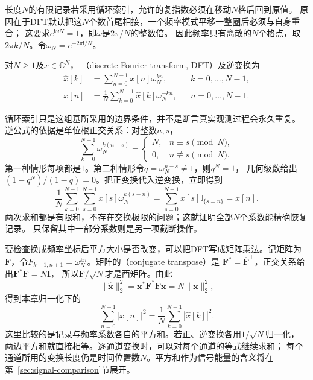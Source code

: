 长度$N$的有限记录若采用循环索引，允许的复指数必须在移动$N$格后回到原值。
原因在于DFT默认把这$N$个数首尾相接，一个频率模式平移一整圈后必须与自身重合；
这要求$e^{\mathrm i\omega N}=1$，即$\omega$是$2\pi/N$的整数倍。
因此频率只有离散的$N$个格点，取$2\pi k/N$。令$\omega_N=e^{-2\pi\mathrm i/N}$。
\begin{definition}[离散傅里叶变换]
  \label{def:signal-analysis-dft}
  对$N\geq1$及$x\in\mathbb C^N$，
  （discrete Fourier transform, DFT）及逆变换为
  \begin{align}
    \widehat x[k]&=\sum_{n=0}^{N-1}x[n]\omega_N^{kn},
    &&k=0,\ldots,N-1,
    \label{eq:signal-analysis-dft}\\
    x[n]&=\frac1N\sum_{k=0}^{N-1}\widehat x[k]\omega_N^{-kn},
    &&n=0,\ldots,N-1.
    \label{eq:signal-analysis-idft}
  \end{align}
\BookEquationAliases{\label{eq:cnn-dft-inverse}}
\end{definition}
循环索引只是这组基所采用的边界条件，并不是断言真实观测过程会永久重复。
逆公式的依据是单位根正交关系：对整数$n,s$，
\begin{equation}
  \sum_{k=0}^{N-1}\omega_N^{k(n-s)}
  =
  \begin{cases}
    N,&n\equiv s\pmod N,\\
    0,&n\not\equiv s\pmod N.
  \end{cases}
  \label{eq:signal-analysis-root-orthogonality}
\end{equation}
第一种情形每项都是$1$。第二种情形令$q=\omega_N^{n-s}\neq1$，则$q^N=1$，
几何级数给出$(1-q^N)/(1-q)=0$。把正变换代入逆变换，立即得到
\[
  \frac1N\sum_{k=0}^{N-1}\sum_{s=0}^{N-1}x[s]\omega_N^{k(s-n)}
  =\sum_{s=0}^{N-1}x[s]\mathbb I_{\{s=n\}}=x[n].
\]
两次求和都是有限和，不存在交换极限的问题；这就证明全部$N$个系数能精确恢复记录。
只保留其中一部分系数则是另一项截断操作。

要检查换成频率坐标后平方大小是否改变，可以把DFT写成矩阵乘法。记矩阵为
$\bm F$，令$F_{k+1,n+1}=\omega_N^{kn}$。矩阵的（conjugate transpose）是
$\bm F^*=\overline{\bm F}^{\top}$，正交关系给出$\bm F^*\bm F=N\bm I$，
所以$\bm F/\sqrt N$才是酉矩阵。由此
\[
  \|\widehat{\bm x}\|_2^2
  =\bm x^*\bm F^*\bm F\bm x=N\|\bm x\|_2^2,
\]
得到本章归一化下的
\begin{equation}
  \sum_{n=0}^{N-1}|x[n]|^2
  =\frac1N\sum_{k=0}^{N-1}|\widehat x[k]|^2.
  \label{eq:signal-analysis-parseval}
\end{equation}
这里比较的是记录与频率系数各自的平方和。若正、逆变换各用$1/\sqrt N$归一化，
两边平方和就直接相等。逐通道变换时，可以对每个通道的等式继续求和；
每个通道所用的变换长度仍是时间位置数$N$。平方和作为信号能量的含义将在
第~\ref{sec:signal-comparison}节展开。

